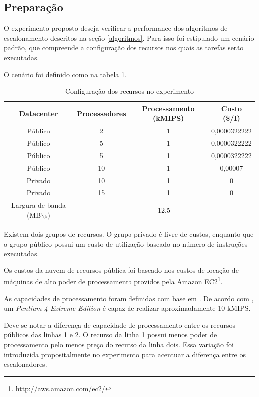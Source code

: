 \documentclass[a4paper,10pt]{article}
\begin{document}
\subsection{Preparação}

O experimento proposto deseja verificar a performance dos algoritmos de escalonamento
descritos na seção \ref{algoritmos}. Para isso foi estipulado um cenário padrão, que
compreende a configuração dos recursos nos quais as tarefas serão executadas.

O cenário foi definido como na tabela \ref{tab:datacenter}.

\begin{table}
\centering

  \begin{tabular}{|c|c|c|c|}  
    \hline
    Datacenter & Processadores & Processamento (kMIPS) & Custo (\$/I) \\
    \hline
    Público & 2 & 1 & 0,0000322222 \\
    \hline
    Público & 5 & 1 & 0,0000322222 \\
    \hline
    Público & 5 & 1 & 0,0000322222 \\
    \hline
    Público & 10 & 1 & 0,00007 \\
    \hline
    Privado & 10 & 1 & 0 \\
    \hline
    Privado & 15 & 1 & 0 \\
    \hline
    \hline
    Largura de banda (MB$\backslash$s)& \multicolumn{3}{|c|}{12,5} \\
    \hline

  \end{tabular}
  \caption{Configuração dos recursos no experimento}
  \label{tab:datacenter}
\end{table}

Existem dois grupos de recursos. O grupo privado é livre de custos, enquanto que o grupo público possui
um custo de utilização baseado no número de instruções executadas. 

Os custos da nuvem de recursos pública foi baseado nos custos de locação de máquinas de alto poder de
processamento providos pela Amazon EC2\footnote{http://aws.amazon.com/ec2/}.

As capacidades de processamento foram definidas com base em \cite{ips_wiki}. De acordo com \cite{ips_wiki},
um \emph{Pentium 4 Extreme Edition} é capaz de realizar aproximadamente 10 kMIPS.

Deve-se notar a diferença de capacidade de processamento entre os recursos públicos das linhas 1 e 2.
O recurso da linha 1 possui menos poder de processamento pelo menos preço do recurso da linha dois. Essa
variação foi introduzida propositalmente no experimento para acentuar a diferença entre os escalonadores.
\end{document}
